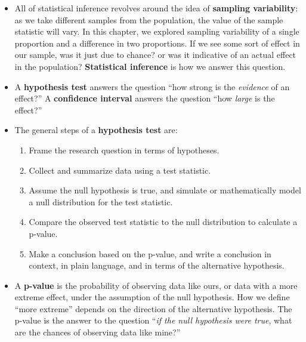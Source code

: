 \documentclass[
  10pt,
  openany]{book}
\providecommand{\tightlist}{%
  \setlength{\itemsep}{0pt}\setlength{\parskip}{0pt}}
\theoremstyle{definition}
\theoremstyle{definition}
\theoremstyle{definition}
\theoremstyle{definition}
\theoremstyle{remark}
\begin{document}
\begin{itemize}
\item
  All of statistical inference revolves around the idea of \textbf{sampling variability}: as we take different samples from the population, the value of the sample statistic will vary. In this chapter, we explored sampling variability of a single proportion and a difference in two proportions. If we see some sort of effect in our sample, was it just due to chance? or was it indicative of an actual effect in the population? \textbf{Statistical inference} is how we answer this question.
\item
  A \textbf{hypothesis test} answers the question ``how strong is the \emph{evidence} of an effect?'' A \textbf{confidence interval} answers the question ``how \emph{large} is the effect?''
\item
  The general steps of a \textbf{hypothesis test} are:

  \begin{enumerate}
  \def\labelenumi{\arabic{enumi}.}
  \tightlist
  \item
    Frame the research question in terms of hypotheses.
  \item
    Collect and summarize data using a test statistic.
  \item
    Assume the null hypothesis is true, and simulate or mathematically model a null distribution for the test statistic.
  \item
    Compare the observed test statistic to the null distribution to calculate a p-value.
  \item
    Make a conclusion based on the p-value, and write a conclusion in context, in plain language, and in terms of the alternative hypothesis.
  \end{enumerate}
\item
  A \textbf{p-value} is the probability of observing data like ours, or data with a more extreme effect, under the assumption of the null hypothesis. How we define ``more extreme'' depends on the direction of the alternative hypothesis. The p-value is the answer to the question ``\emph{if the null hypothesis were true}, what are the chances of observing data like mine?''


\end{itemize}
\end{document}
